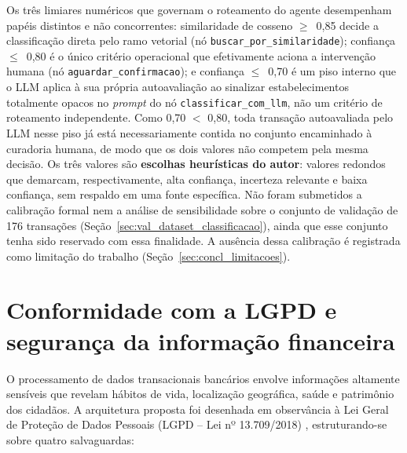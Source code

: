 Os três limiares numéricos que governam o roteamento do agente desempenham papéis distintos e não concorrentes: similaridade de cosseno $\ge$~0,85 decide a classificação direta pelo ramo vetorial (nó \texttt{buscar\_por\_similaridade}); confiança $\le$~0,80 é o único critério operacional que efetivamente aciona a intervenção humana (nó \texttt{aguardar\_confirmacao}); e confiança $\le$~0,70 é um piso interno que o LLM aplica à sua própria autoavaliação ao sinalizar estabelecimentos totalmente opacos no \textit{prompt} do nó \texttt{classificar\_com\_llm}, não um critério de roteamento independente. Como 0,70 $<$ 0,80, toda transação autoavaliada pelo LLM nesse piso já está necessariamente contida no conjunto encaminhado à curadoria humana, de modo que os dois valores não competem pela mesma decisão. Os três valores são \textbf{escolhas heurísticas do autor}: valores redondos que demarcam, respectivamente, alta confiança, incerteza relevante e baixa confiança, sem respaldo em uma fonte específica. Não foram submetidos a calibração formal nem a análise de sensibilidade sobre o conjunto de validação de 176 transações (Seção~\ref{sec:val_dataset_classificacao}), ainda que esse conjunto tenha sido reservado com essa finalidade. A ausência dessa calibração é registrada como limitação do trabalho (Seção~\ref{sec:concl_limitacoes}).

\section{Conformidade com a LGPD e segurança da informação financeira}
\label{sec:sol_lgpd}

O processamento de dados transacionais bancários envolve informações altamente sensíveis que revelam hábitos de vida, localização geográfica, saúde e patrimônio dos cidadãos. A arquitetura proposta foi desenhada em observância à Lei Geral de Proteção de Dados Pessoais (LGPD -- Lei nº 13.709/2018) \cite{brasil2018lgpd}, estruturando-se sobre quatro salvaguardas:

